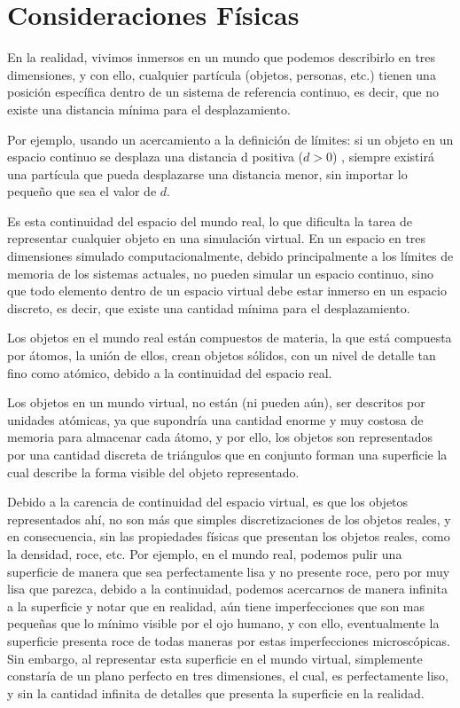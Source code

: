 \section{Consideraciones Físicas}
\label{sec:consideracionesFisicas}
En la realidad, vivimos inmersos en un mundo que podemos describirlo en tres
dimensiones, y con ello, cualquier partícula (objetos, personas, etc.) tienen una posición
específica dentro de un sistema de referencia continuo, es decir, que no existe una distancia
mínima para el desplazamiento.

Por ejemplo, usando un acercamiento a la definición de límites: si un objeto en un espacio
continuo se desplaza una distancia  d  positiva  ($d > 0$) , siempre existirá una partícula que
pueda desplazarse una distancia menor, sin importar lo pequeño que sea el valor de $d$.

Es esta continuidad del espacio del mundo real, lo que dificulta la tarea de representar
cualquier objeto en una simulación virtual.
En un espacio en tres dimensiones simulado computacionalmente, debido principalmente
a los límites de memoria de los sistemas actuales, no pueden simular un espacio continuo, sino
que todo elemento dentro de un espacio virtual debe estar inmerso en un espacio discreto, es
decir, que existe una cantidad mínima para el desplazamiento.

Los objetos en el mundo real están compuestos de materia, la que está compuesta por
átomos, la unión de ellos, crean objetos sólidos, con un nivel de detalle tan fino como atómico,
debido a la continuidad del espacio real.

Los objetos en un mundo virtual, no están (ni pueden aún), ser descritos por unidades
atómicas, ya que supondría una cantidad enorme y muy costosa de memoria para almacenar cada
átomo, y por ello, los objetos son representados por una cantidad discreta de triángulos que en
conjunto forman una superficie la cual describe la forma visible del objeto representado.

Debido a la carencia de continuidad del espacio virtual, es que los objetos representados
ahí, no son más que simples discretizaciones de los objetos reales, y en consecuencia, sin las
propiedades físicas que presentan los objetos reales, como la densidad, roce, etc.
Por ejemplo, en el mundo real, podemos pulir una superficie de manera que sea
perfectamente lisa y no presente roce, pero por muy lisa que parezca, debido a la continuidad,
podemos acercarnos de manera infinita a la superficie y notar que en realidad, aún tiene
imperfecciones que son mas pequeñas que lo mínimo visible por el ojo humano, y con ello,
eventualmente la superficie presenta roce de todas maneras por estas imperfecciones
microscópicas. Sin embargo, al representar esta superficie en el mundo virtual, simplemente
constaría de un plano perfecto en tres dimensiones, el cual, es perfectamente liso, y sin la
cantidad infinita de detalles que presenta la superficie en la realidad.

